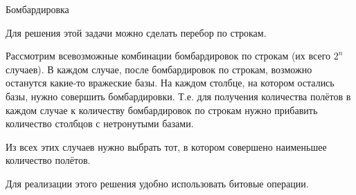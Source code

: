 \begin{tutorial}{Бомбардировка}

Для решения этой задачи можно сделать перебор по строкам.

Рассмотрим всевозможные комбинации бомбардировок по строкам (их всего $2^n$ случаев). В каждом случае, после бомбардировок по строкам, возможно останутся какие-то вражеские базы. На каждом столбце, на котором остались базы, нужно совершить бомбардировки. Т.е. для получения количества полётов в каждом случае к количеству бомбардировок по строкам нужно прибавить количество столбцов с нетронутыми базами.

Из всех этих случаев нужно выбрать тот, в котором совершено наименьшее количество полётов.

Для реализации этого решения удобно использовать битовые операции.

\end{tutorial}
